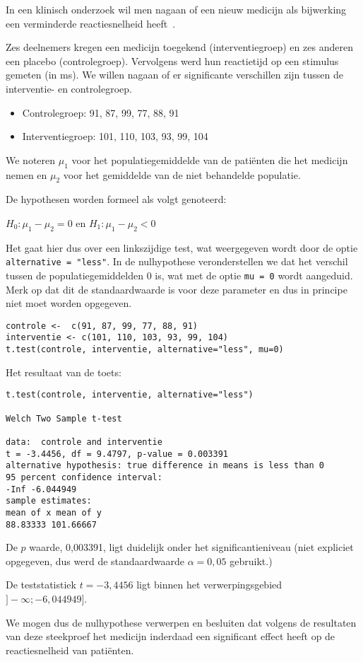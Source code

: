\begin{example}
  In een klinisch onderzoek wil men nagaan of een nieuw medicijn als bijwerking een verminderde reactiesnelheid heeft~\autocite{Lindquist}.
  
  Zes deelnemers kregen een medicijn toegekend (interventiegroep) en zes anderen een placebo (controlegroep). Vervolgens werd hun reactietijd op een stimulus gemeten (in ms). We willen nagaan of er significante verschillen zijn tussen de interventie- en controlegroep.
  
  \begin{itemize}
    \item Controlegroep: 91, 87, 99, 77, 88, 91
    \item Interventiegroep: 101, 110, 103, 93, 99, 104
  \end{itemize}
  
  We noteren $\mu_1$ voor het populatiegemiddelde van de patiënten die het medicijn nemen en $\mu_2$ voor het gemiddelde van de niet behandelde populatie.
  
  De hypothesen worden formeel als volgt genoteerd:
  
  $H_0: \mu_1 - \mu_2 = 0$ en $H_1: \mu_1 - \mu_2 < 0$
  
  Het gaat hier dus over een linkszijdige test, wat weergegeven wordt door de optie \texttt{alternative = "less"}. In de nulhypothese veronderstellen we dat het verschil tussen de populatiegemiddelden 0 is, wat met de optie \texttt{mu = 0} wordt aangeduid. Merk op dat dit de standaardwaarde is voor deze parameter en dus in principe niet moet worden opgegeven.
  
\begin{lstlisting}
controle <-  c(91, 87, 99, 77, 88, 91)
interventie <- c(101, 110, 103, 93, 99, 104)
t.test(controle, interventie, alternative="less", mu=0)
\end{lstlisting}

  Het resultaat van de toets:
  
\begin{verbatim}
t.test(controle, interventie, alternative="less")

Welch Two Sample t-test

data:  controle and interventie
t = -3.4456, df = 9.4797, p-value = 0.003391
alternative hypothesis: true difference in means is less than 0
95 percent confidence interval:
-Inf -6.044949
sample estimates:
mean of x mean of y 
88.83333 101.66667
\end{verbatim}

  De $p$ waarde, 0,003391, ligt duidelijk onder het significantieniveau (niet expliciet opgegeven, dus werd de standaardwaarde $\alpha = 0,05$ gebruikt.)
  
  De teststatistiek $t = -3,4456$ ligt binnen het verwerpingsgebied $]-\infty; -6,044949]$.
  
  We mogen dus de nulhypothese verwerpen en besluiten dat volgens de resultaten van deze steekproef het medicijn inderdaad een significant effect heeft op de reactiesnelheid van patiënten.
\end{example}

